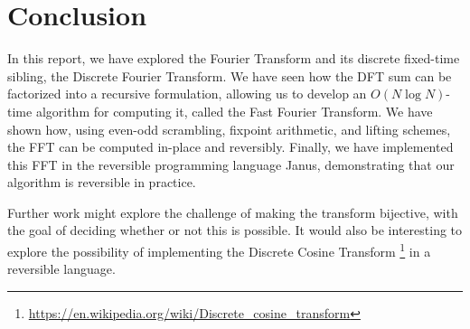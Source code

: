 \section{Conclusion}
In this report, we have explored the Fourier Transform and its discrete fixed-time sibling, the
Discrete Fourier Transform.
We have seen how the DFT sum can be factorized into a recursive formulation,
allowing us to develop an $O(N \log N)$-time algorithm for computing it,
called the Fast Fourier Transform.
We have shown how, using even-odd scrambling, fixpoint arithmetic,
and lifting schemes, the FFT can be computed in-place and reversibly.
Finally, we have implemented this FFT in the reversible programming language Janus,
demonstrating that our algorithm is reversible in practice.

Further work might explore the challenge of making the transform bijective,
with the goal of deciding whether or not this is possible.
It would also be interesting to explore the possibility of implementing
the Discrete Cosine Transform
\footnote{\url{https://en.wikipedia.org/wiki/Discrete_cosine_transform}}
in a reversible language.
